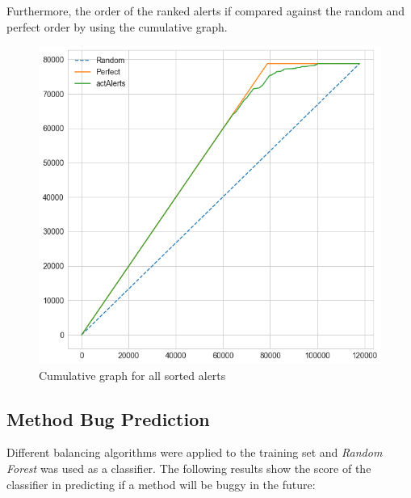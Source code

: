 Furthermore, the order of the ranked alerts if compared against the random and perfect order by using the cumulative graph.
\begin{figure}[H]
	\centering
	\includegraphics[scale=0.4]{./src/actAlerts/cumulative_graph_all.png}
	\caption{Cumulative graph for all sorted alerts}
	\label{}
\end{figure}


\subsection{Method Bug Prediction}

Different balancing algorithms were applied to the training set and \textit{Random Forest} was used as a classifier. The following results show the score of the classifier in predicting if a method will be buggy in the future:

